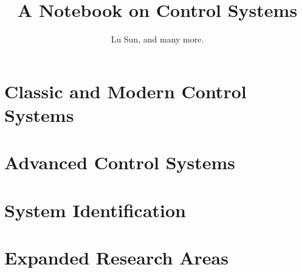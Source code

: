 



\makeindex



\frontmatter

\title{A Notebook on Control Systems}
\author{Lu Sun, and many more.}

\maketitle


\tableofcontents


\listoffigures
\listoftables

\mainmatter

\part{Classic and Modern Control Systems}







\part{Advanced Control Systems}







\part{System Identification}







\part{Expanded Research Areas}





\appendix







\printindex


